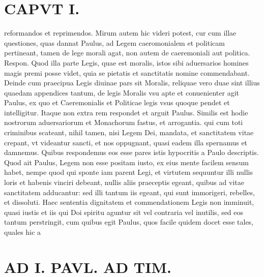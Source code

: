 \documentclass{article}
\begin{document}
\begin{pages}
\section*{CAPVT   I. }
\marginpar{[ p.21 ]}\pstart reformandos et reprimendos. Mirum autem hic videri potest, cur cum illae questiones, quas dannat Paulus, ad Legem caeromonialem et politicam pertineant, tamen de lege morali agat, non autem de caeremoniali aut politica. Respon. Quod illa parte Legis, quae est moralis, istos sibi aduersarios homines magis premi posse videt, quia se pietatis et sanctitatis nomine commendabant. Deinde cum praecipua Legis diuinae pars sit Moralis, reliquae vero duae sint illius quaedam appendices tantum, de legis Moralis vsu apte et conuenienter agit Paulus, ex quo et Caeremonialis et Politicae legis vsus quoque pendet et intelligitur. Itaque non extra rem respondet et arguit Paulus. Similis est hodie nostrorum aduersariorum et Monachorum fastus, et arrogantia. qui cum toti criminibus scateant, nihil tamen, nisi Legem Dei, mandata, et sanctitatem vitae crepant, vt videantur sancti, et nos oppugnant, quasi eadem illa spernamus et damnemus. Quibus respondemus eos esse pares istis hypocritis a Paulo descriptis. Quod ait Paulus, Legem non esse positam iusto, ex eius mente facilem sensum habet, nempe quod qui sponte iam parent Legi, et virtutem sequuntur illi nullis loris et habenis vinciri debeant, nullis aliis praeceptis egeant, quibus ad vitae sanctitatem adducantur: sed illi tantum iis egeant, qui sunt immorigeri, rebelles, et dissoluti. Haec sententia dignitatem et commendationem Legis non imminuit, quasi iustis et iis qui Doi spiritu aguntur sit vel contraria vel inutilis, sed eos tantum perstringit, cum quibus egit Paulus, quos facile quidem docet esse tales, quales hic a\pend
\section*{AD I. PAVL. AD TIM. }
\marginpar{[ p.22 ]}\pstart {}
{}

\end{pages}
\end{document}
